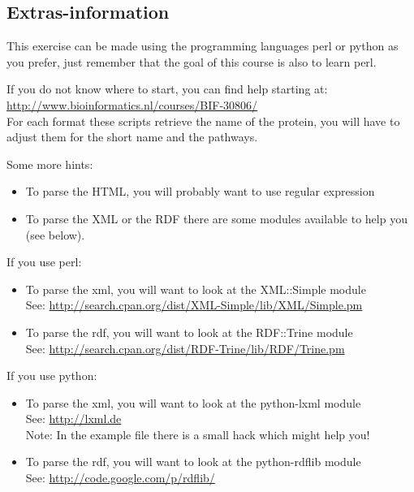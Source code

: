 \documentclass[margin]{res}
\begin{document}
\begin{resume}
\section{Extras-information} This exercise can be made using the programming
                languages perl or python as you prefer, just remember that
                the goal of this course is also to learn perl.

                If you do not know where to start, you can find help starting
                at: \\
                \url{http://www.bioinformatics.nl/courses/BIF-30806/} \\
                For each format these scripts retrieve the name of the protein,
                you will have to adjust them for the short name and the pathways.
                
                Some more hints:
                \begin{itemize}
                    \item To parse the HTML, you will probably want to use regular expression
                    \item To parse the XML or the RDF there are some modules available to help you (see below).
                \end{itemize}
                If you use perl:
                \begin{itemize}
                    \item To parse the xml, you will want to look at the XML::Simple module \\
                    See: \url{http://search.cpan.org/dist/XML-Simple/lib/XML/Simple.pm}
                    \item To parse the rdf, you will want to look at the RDF::Trine module \\
                    See: \url{http://search.cpan.org/dist/RDF-Trine/lib/RDF/Trine.pm}
                \end{itemize}
                
                If you use python:
                \begin{itemize}
                    \item To parse the xml, you will want to look at the python-lxml module \\
                    See: \url{http://lxml.de} \\
                    Note: In the example file there is a small hack which might help you!
                    \item To parse the rdf, you will want to look at the python-rdflib module \\
                    See: \url{http://code.google.com/p/rdflib/}
                \end{itemize}
                

\end{resume}
\end{document}
